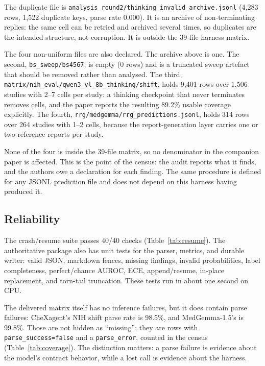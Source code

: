 The duplicate file is \texttt{analysis\_round2/thinking\_invalid\_archive.jsonl}
(4{,}283 rows, 1{,}522 duplicate keys, parse rate 0.000). It is an archive of
non-terminating replies: the same cell can be retried and archived several times,
so duplicates are the intended structure, not corruption. It is outside the
39-file harness matrix.

{\sloppy
The four non-uniform files are also declared. The archive above is one. The second,
\texttt{bs\_sweep/bs4567}, is empty (0 rows) and is a truncated sweep artefact that
should be removed rather than analysed. The third,
\texttt{matrix/nih\_eval/qwen3\_vl\_8b\_thinking/shift}, holds 9{,}401 rows over
1{,}506 studies with 2--7 cells per study: a thinking checkpoint that never
terminates removes cells, and the paper reports the resulting 89.2\% usable
coverage explicitly. The fourth, \texttt{rrg/medgemma/rrg\_predictions.jsonl},
holds 314 rows over 264 studies with 1--2 cells, because the report-generation
layer carries one or two reference reports per study.\par}

None of the four is inside the 39-file matrix, so no denominator in the companion
paper is affected. This is the point of the census: the audit reports what it
finds, and the authors owe a declaration for each finding. The same procedure is
defined for any JSONL prediction file and does not depend on this harness having
produced it.

\subsection{Reliability}

The crash/resume suite passes 40/40 checks (Table~\ref{tab:resume}). The authoritative package also has unit tests for the parser, metrics, and durable writer: valid JSON, markdown fences, missing findings, invalid probabilities, label completeness, perfect/chance AUROC, ECE, append/resume, in-place replacement, and torn-tail truncation. These tests run in about one second on CPU.

The delivered matrix itself has no inference failures, but it does contain parse failures: CheXagent's NIH shift parse rate is 98.5\%, and MedGemma-1.5's is 99.8\%. Those are not hidden as ``missing''; they are rows with \texttt{parse\_success=false} and a \texttt{parse\_error}, counted in the census (Table~\ref{tab:coverage}). The distinction matters: a parse failure is evidence about the model's contract behavior, while a lost call is evidence about the harness.

